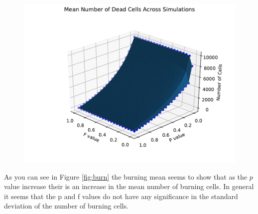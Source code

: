 \documentclass{article}
\begin{document}
\begin{figure}[H]
\centering
\includegraphics[scale=0.6]{Dead Mean 3D.pdf}
\label{fig:deadmean3D}
\end{figure}
As you can see in Figure \ref{fig:burn} the burning mean seems to show that as the $p$ value increase their is an increase in the mean number of burning cells. In general it seems that the p and f values do not have any significance in the standard deviation of the number of burning cells.
\end{document}
